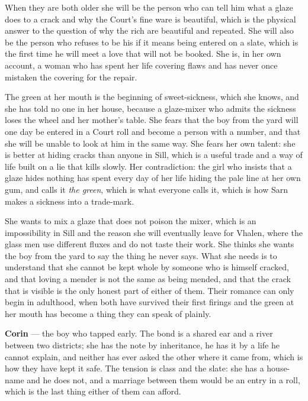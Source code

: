 \documentclass{design/chronicle}
\begin{document}
{When they are both older she will be the person who can tell him what a glaze does to a crack and why the Court’s fine ware is beautiful, which is the physical answer to the question of why the rich are beautiful and repeated. She will also be the person who refuses to be his if it means being entered on a slate, which is the first time he will meet a love that will not be booked. She is, in her own account, a woman who has spent her life covering flaws and has never once mistaken the covering for the repair.

The green at her mouth is the beginning of sweet-sickness, which she knows, and she has told no one in her house, because a glaze-mixer who admits the sickness loses the wheel and her mother’s table. She fears that the boy from the yard will one day be entered in a Court roll and become a person with a number, and that she will be unable to look at him in the same way. She fears her own talent: she is better at hiding cracks than anyone in Sill, which is a useful trade and a way of life built on a lie that kills slowly. Her contradiction: the girl who insists that a glaze hides nothing has spent every day of her life hiding the pale line at her own gum, and calls it \emph{the green}, which is what everyone calls it, which is how Sarn makes a sickness into a trade-mark.

She wants to mix a glaze that does not poison the mixer, which is an impossibility in Sill and the reason she will eventually leave for Vhalen, where the glass men use different fluxes and do not taste their work. She thinks she wants the boy from the yard to say the thing he never says. What she needs is to understand that she cannot be kept whole by someone who is himself cracked, and that loving a mender is not the same as being mended, and that the crack that is visible is the only honest part of either of them. Their romance can only begin in adulthood, when both have survived their first firings and the green at her mouth has become a thing they can speak of plainly.

\textbf{Corin} — the boy who tapped early. The bond is a shared ear and a river between two districts; she has the note by inheritance, he has it by a life he cannot explain, and neither has ever asked the other where it came from, which is how they have kept it safe. The tension is class and the slate: she has a house-name and he does not, and a marriage between them would be an entry in a roll, which is the last thing either of them can afford.

}
\end{document}
